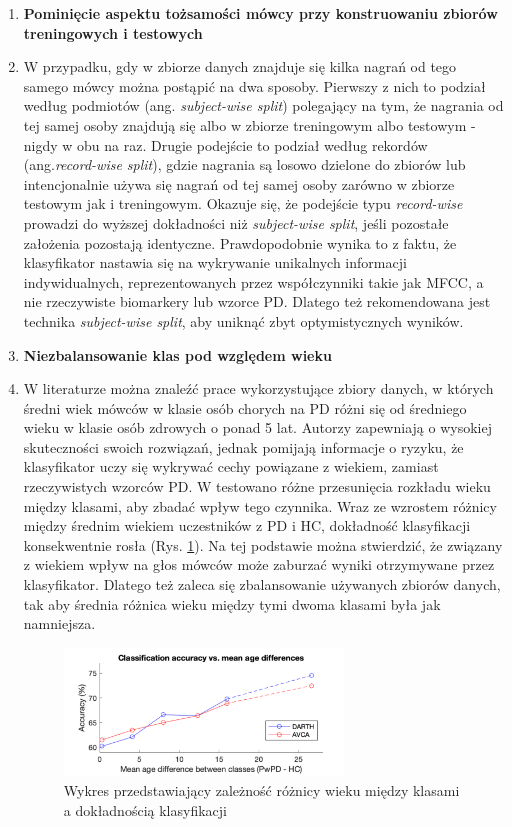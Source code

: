 \begin{enumerate}[label={\alph*)}]
	\item \textbf{Pominięcie aspektu tożsamości mówcy przy konstruowaniu zbiorów treningowych i testowych}
	\item[] W przypadku, gdy w zbiorze danych znajduje się kilka nagrań od tego samego mówcy można postąpić na dwa sposoby.
Pierwszy z nich to podział według podmiotów (ang. \emph{subject-wise split}) polegający na tym, że nagrania od tej samej
osoby znajdują się albo w zbiorze treningowym albo testowym - nigdy w obu na raz.
Drugie podejście to podział według rekordów (ang.\emph{record-wise split}), gdzie nagrania są losowo dzielone do zbiorów
lub intencjonalnie używa się nagrań od tej samej osoby zarówno w zbiorze testowym jak i treningowym.
Okazuje się, że podejście typu \emph{record-wise} prowadzi do wyższej dokładności niż \emph{subject-wise split}, jeśli pozostałe założenia pozostają identyczne.
Prawdopodobnie wynika to z faktu, że klasyfikator nastawia się na wykrywanie unikalnych informacji indywidualnych,
reprezentowanych przez współczynniki takie jak MFCC, a nie rzeczywiste biomarkery lub wzorce PD.
Dlatego też rekomendowana jest technika \emph{subject-wise split}, aby uniknąć zbyt optymistycznych wyników.

  	\item \textbf{Niezbalansowanie klas pod względem wieku}
	\item[] W literaturze można znaleźć prace wykorzystujące zbiory danych, w których średni wiek mówców
w klasie osób chorych na PD różni się od średniego wieku w klasie osób zdrowych o ponad 5 lat.
Autorzy zapewniają o wysokiej skuteczności swoich rozwiązań, jednak pomijają informacje o ryzyku, że klasyfikator
uczy się wykrywać cechy powiązane z wiekiem, zamiast rzeczywistych wzorców PD.
W \cite{SustainedVowelsProblems} testowano różne przesunięcia rozkładu wieku między klasami, aby zbadać wpływ tego czynnika.
Wraz ze wzrostem różnicy między średnim wiekiem uczestników z PD i HC, dokładność klasyfikacji konsekwentnie rosła (Rys. \ref{fig:acc_and_age_diff}).
Na tej podstawie można stwierdzić, że związany z wiekiem wpływ na głos mówców może zaburzać wyniki otrzymywane przez klasyfikator.
Dlatego też zaleca się zbalansowanie używanych zbiorów danych, tak aby średnia różnica wieku między tymi dwoma klasami  była jak namniejsza.


\begin{figure}[htbp]
	\centering
	\includegraphics[width=0.7\textwidth]{./img/acc_and_age_difference}
	\caption{Wykres przedstawiający zależność różnicy wieku między klasami a dokładnością klasyfikacji \cite{SustainedVowelsProblems}}
    \label{fig:acc_and_age_diff}
\end{figure}


\end{enumerate}
